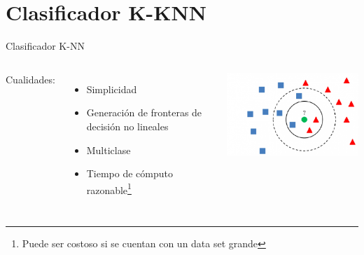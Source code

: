 \documentclass[
  24pt, %
]{beamer}
\begin{document}
\section{Clasificador K-KNN}
\begin{frame}{Clasificador K-NN}
  \begin{columns}
    Cualidades:
    
    \begin{itemize}
      \pause
    \item Simplicidad
      \pause
    \item Generación de fronteras de decisión no lineales
      \pause
    \item Multiclase
      \pause
    \item Tiempo de cómputo razonable\footnote{Puede ser costoso si se cuentan con un data set grande}
    \end{itemize}
    \includegraphics[width=\textwidth]{knn}
    
  \end{columns}
\end{frame}
\end{document}
